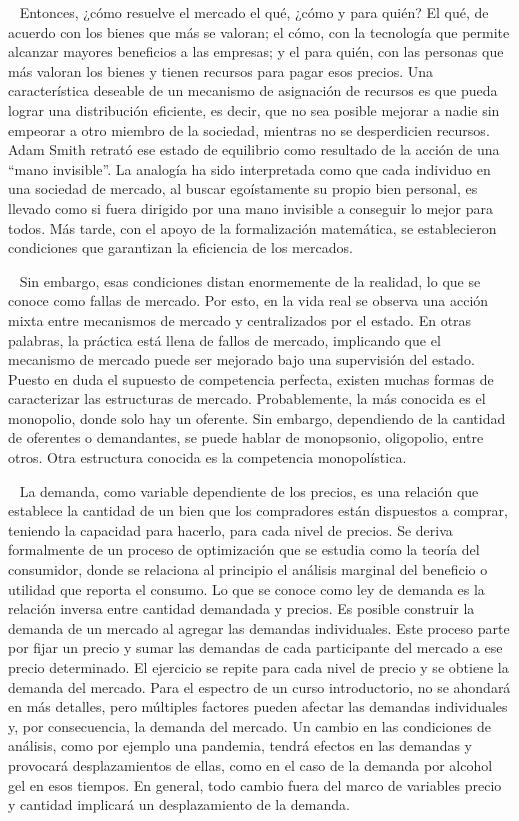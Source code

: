\documentclass[
  letterpaper,
  DIV=11,
  numbers=noendperiod]{scrreport}
\begin{document}
~ Entonces, ¿cómo resuelve el mercado el qué, ¿cómo y para quién? El
qué, de acuerdo con los bienes que más se valoran; el cómo, con la
tecnología que permite alcanzar mayores beneficios a las empresas; y el
para quién, con las personas que más valoran los bienes y tienen
recursos para pagar esos precios. Una característica deseable de un
mecanismo de asignación de recursos es que pueda lograr una distribución
eficiente, es decir, que no sea posible mejorar a nadie sin empeorar a
otro miembro de la sociedad, mientras no se desperdicien recursos. Adam
Smith retrató ese estado de equilibrio como resultado de la acción de
una ``mano invisible''. La analogía ha sido interpretada como que cada
individuo en una sociedad de mercado, al buscar egoístamente su propio
bien personal, es llevado como si fuera dirigido por una mano invisible
a conseguir lo mejor para todos. Más tarde, con el apoyo de la
formalización matemática, se establecieron condiciones que garantizan la
eficiencia de los mercados.

~ Sin embargo, esas condiciones distan enormemente de la realidad, lo
que se conoce como fallas de mercado. Por esto, en la vida real se
observa una acción mixta entre mecanismos de mercado y centralizados por
el estado. En otras palabras, la práctica está llena de fallos de
mercado, implicando que el mecanismo de mercado puede ser mejorado bajo
una supervisión del estado. Puesto en duda el supuesto de competencia
perfecta, existen muchas formas de caracterizar las estructuras de
mercado. Probablemente, la más conocida es el monopolio, donde solo hay
un oferente. Sin embargo, dependiendo de la cantidad de oferentes o
demandantes, se puede hablar de monopsonio, oligopolio, entre otros.
Otra estructura conocida es la competencia monopolística.

~ La demanda, como variable dependiente de los precios, es una relación
que establece la cantidad de un bien que los compradores están
dispuestos a comprar, teniendo la capacidad para hacerlo, para cada
nivel de precios. Se deriva formalmente de un proceso de optimización
que se estudia como la teoría del consumidor, donde se relaciona al
principio el análisis marginal del beneficio o utilidad que reporta el
consumo. Lo que se conoce como ley de demanda es la relación inversa
entre cantidad demandada y precios. Es posible construir la demanda de
un mercado al agregar las demandas individuales. Este proceso parte por
fijar un precio y sumar las demandas de cada participante del mercado a
ese precio determinado. El ejercicio se repite para cada nivel de precio
y se obtiene la demanda del mercado. Para el espectro de un curso
introductorio, no se ahondará en más detalles, pero múltiples factores
pueden afectar las demandas individuales y, por consecuencia, la demanda
del mercado. Un cambio en las condiciones de análisis, como por ejemplo
una pandemia, tendrá efectos en las demandas y provocará desplazamientos
de ellas, como en el caso de la demanda por alcohol gel en esos tiempos.
En general, todo cambio fuera del marco de variables precio y cantidad
implicará un desplazamiento de la demanda.
\end{document}
